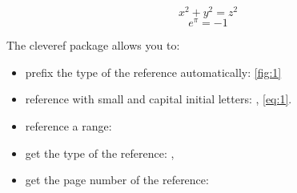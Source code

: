 \documentclass{article}
\begin{document}
\begin{equation}
	x^2+y^2=z^2
	\label{eq:1}
\end{equation}
\begin{equation}
e^{\pi} = -1
\label{eq:2}
\end{equation}

The cleveref package allows you to:
\begin{itemize}
	\item prefix the type of the reference automatically: \cref{fig:1}
	\item reference with small and capital initial letters: , \cref{eq:1}.
	\item reference a range: 
	\item get the type of the reference: , 
	\item get the page number of the reference: 
\end{itemize}
\end{document}
